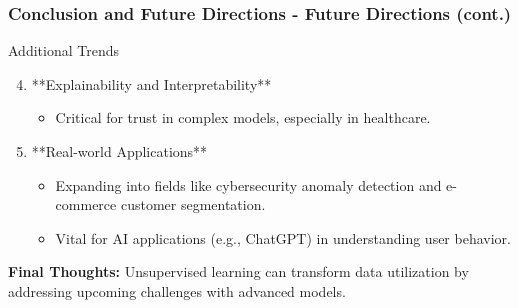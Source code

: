 \documentclass[aspectratio=169]{beamer}
\begin{document}
\begin{frame}[fragile]
    \frametitle{Conclusion and Future Directions - Future Directions (cont.)}
    \begin{block}{Additional Trends}
        \begin{enumerate}
            \setcounter{enumi}{3}
            \item **Explainability and Interpretability**
                \begin{itemize}
                    \item Critical for trust in complex models, especially in healthcare.
                \end{itemize}
            \item **Real-world Applications**
                \begin{itemize}
                    \item Expanding into fields like cybersecurity anomaly detection and e-commerce customer segmentation.
                    \item Vital for AI applications (e.g., ChatGPT) in understanding user behavior.
                \end{itemize}
        \end{enumerate}
        \vspace{0.5cm}
        \textbf{Final Thoughts:} Unsupervised learning can transform data utilization by addressing upcoming challenges with advanced models.
    \end{block}
\end{frame}
\end{document}
